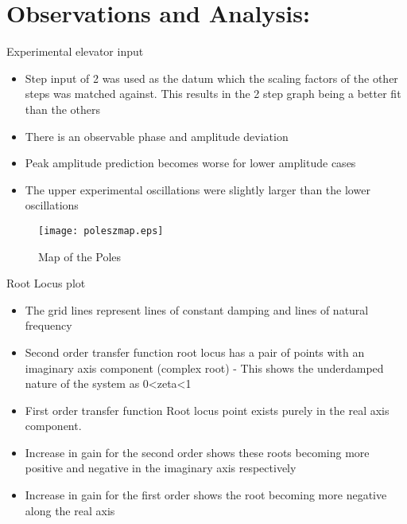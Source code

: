 \section{Observations and Analysis:}\label{observations-and-analysis}

Experimental elevator input

\begin{itemize}
\tightlist
\item
  Step input of 2 was used as the datum which the scaling factors of the
  other steps was matched against. This results in the 2 step graph
  being a better fit than the others
\item
  There is an observable phase and amplitude deviation
\item
  Peak amplitude prediction becomes worse for lower amplitude cases
\item
  The upper experimental oscillations were slightly larger than the
  lower oscillations
\end{itemize}

\begin{wrapfigure}{r}{0.45\textwidth}
  \begin{center}
  \vspace{0pt}
  \texttt{[image: poleszmap.eps]}
  \end{center}
  \caption{Map of the Poles}
 \label{poleszmap}
  \vspace{-25pt}
\end{wrapfigure}

Root Locus plot

\begin{itemize}
\tightlist
\item
  The grid lines represent lines of constant damping and lines of
  natural frequency
\item
  Second order transfer function root locus has a pair of points with an
  imaginary axis component (complex root) - This shows the underdamped
  nature of the system as 0\textless{}zeta\textless{}1
\item
  First order transfer function Root locus point exists purely in the
  real axis component.
\item
  Increase in gain for the second order shows these roots becoming more
  positive and negative in the imaginary axis respectively
\item
  Increase in gain for the first order shows the root becoming more
  negative along the real axis
\end{itemize}

